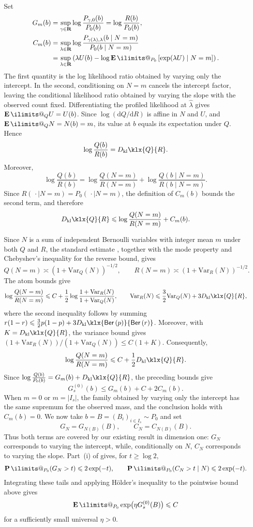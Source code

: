 \documentclass[11pt, letterpaper, hidelinks]{article}
\makeatletter
\renewcommand{\proofname}{\textit{\textbf{Proof}}}
\renewenvironment{proof}[1][\proofname]{\par\pushQED{\qed}\normalfont \topsep6\p@\@plus6\p@\relax\trivlist\item[\hskip\labelsep#1\@addpunct{}]\ignorespaces}{\popQED\endtrivlist\@endpefalse}
\newcommand{\proofsketchname}{\textit{\textbf{Proof sketch}}}
\newenvironment{proofsketch}
  {\begin{proof}[\proofsketchname]}
  {\end{proof}}
\newcommand{\R}{\mathbf R}
\newcommand{\ud}[0]{\mathrm{d}}
\newcommand{\1}{\mathbf 1}
\renewcommand{\leq}{\leqslant}
\renewcommand{\geq}{\geqslant}
\newcommand{\kl}{D_{\rm kl}\klx}
\newcommand{\Var}{\mathrm{Var}}
\newcommand{\E}{\operatorname*{\mathbf{E}}\ilimits@}
\renewcommand{\P}{\operatorname*{\mathbf{P}}\ilimits@}
\theoremstyle{plain}
\theoremstyle{definition}
\newcommand{\Ber}[1]{\mathsf{Ber}\left(#1\right)}
\makeatother
\begin{document}
\begin{proofsketch}
\[\]
Set
\[
\begin{aligned}
G_m(b)&=\sup_{\gamma\in\R}\log\frac{P_{\gamma,0}(b)}{P_0(b)}
=\log\frac{R(b)}{P_0(b)},\\
C_m(b)&=\sup_{\lambda\in\R}
\log\frac{P_{\gamma(\lambda),\lambda}(b\mid N=m)}
{P_0(b\mid N=m)}\\
&=\sup_{\lambda\in\R}
\left(\lambda U(b)-
\log\E_{P_0}\left[\exp(\lambda U)\mid N=m\right]\right).
\end{aligned}
\]
The first quantity is the log likelihood ratio obtained by varying only the
intercept.  In the second, conditioning on $N=m$ cancels the intercept factor,
leaving the conditional likelihood ratio obtained by varying the slope with
the observed count fixed.  Differentiating the profiled likelihood at
$\widehat\lambda$ gives $\E_QU=U(b)$.  Since $\log(\ud Q/\ud R)$ is affine in $N$ and $U$, and
$\E_QN=N(b)=m$, its value at $b$ equals its expectation under $Q$.  Hence
\[
\log\frac{Q(b)}{R(b)}
=\kl{Q}{R}.
\]
Moreover,
\[
\log\frac{Q(b)}{R(b)}
=\log\frac{Q(N=m)}{R(N=m)}
+\log\frac{Q(b\mid N=m)}{R(b\mid N=m)}.
\]
Since $R(\,\cdot\mid N=m)=P_0(\,\cdot\mid N=m)$, the definition of $C_m(b)$
bounds the second term, and therefore
\[
\kl{Q}{R}
\leq\log\frac{Q(N=m)}{R(N=m)}+C_m(b).
\]

Since $N$ is a sum of independent Bernoulli variables with integer mean $m$
under both $Q$ and $R$, the standard estimate
\cite[Theorem~1]{BaillonCominettiVaisman2016}, together with the mode property
\cite[Theorem~4]{Darroch1964} and Chebyshev's inequality for the reverse bound,
gives
\[
Q(N=m)\asymp(1+\Var_Q(N))^{-1/2},
\qquad
R(N=m)\asymp(1+\Var_R(N))^{-1/2}.
\]
The atom bounds give
\[
\log\frac{Q(N=m)}{R(N=m)}
\leq C+\frac12\log\frac{1+\Var_R(N)}{1+\Var_Q(N)},
\qquad
\Var_R(N)\leq\frac32\Var_Q(N)+3\kl{Q}{R},
\]
where the second inequality follows by summing
$r(1-r)\leq\tfrac32p(1-p)+3\kl{\Ber{p}}{\Ber{r}}$. Moreover, with
$K=\kl{Q}{R}$, the variance bound gives
$(1+\Var_R(N))/(1+\Var_Q(N))\leq C(1+K)$.
Consequently,
\[
\log\frac{Q(N=m)}{R(N=m)}
\leq C+\frac12\kl{Q}{R}.
\]
Since $\log\frac{Q(b)}{P_0(b)}=G_m(b)+\kl{Q}{R}$, the preceding bounds give
\begin{equation}
\label{eq:d2-sketch-scalar-reduction}
G_s^{(0)}(b)\leq G_m(b)+C+2C_m(b).
\end{equation}
When $m=0$ or $m=|I_s|$, the family obtained by varying only the intercept has
the same supremum for the observed mass, and the conclusion holds with
$C_m(b)=0$.  We now take
$b=B=(B_i)_{i\in I_s}\sim P_0$ and set
\[
G_N=G_{N(B)}(B),
\qquad
C_N=C_{N(B)}(B).
\]
Thus both terms are covered by our existing result in dimension one: $G_N$
corresponds to varying the intercept, while, conditionally on $N$, $C_N$
corresponds to varying the slope.
Part~(i) of  gives, for $t\geq\log2$,
\[
\P_{P_0}(G_N>t)\leq2\exp(-t),
\qquad
\P_{P_0}(C_N>t\mid N)\leq2\exp(-t).
\]
Integrating these tails and applying H\"older's inequality to the pointwise
bound above gives
\[
\E_{P_0}\exp\bigl(\eta G_s^{(0)}(B)\bigr)\leq C
\]
for a sufficiently small universal $\eta>0$.


\end{proofsketch}
\end{document}
